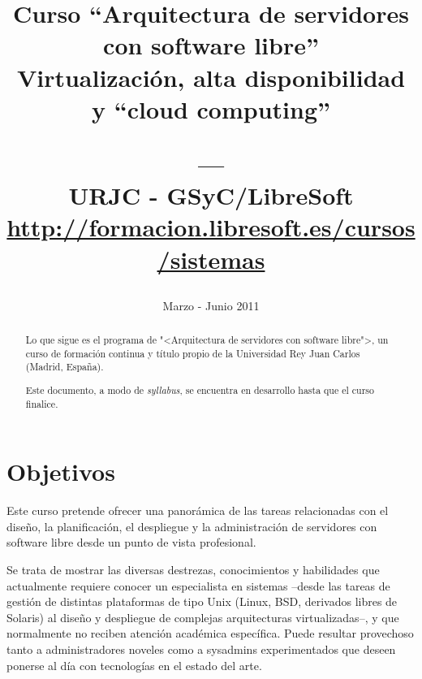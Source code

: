 \documentclass[a4paper]{article}
\title{\textbf{Curso ``Arquitectura de servidores \\ con software libre''} \\
Virtualización, alta disponibilidad \\ y ``cloud computing'' \\
\date{Marzo - Junio 2011}
\vspace{0.5cm}
--- \\
\normalsize{URJC - GSyC/LibreSoft} \\
\small{\url{http://formacion.libresoft.es/cursos/sistemas}}}
\begin{document}
  \maketitle

  \begin{abstract}
    Lo que sigue es el programa de "<Arquitectura de servidores con software libre">, un curso de formación continua y título propio de la Universidad Rey Juan Carlos (Madrid, España). 

    \medskip

    Este documento, a modo de \textit{syllabus}, se encuentra en desarrollo hasta que el curso finalice.
  \end{abstract}
  \newpage

  \tableofcontents

  \newpage

  \section{Objetivos}
  Este curso pretende ofrecer una panorámica de las tareas relacionadas con el diseño, la planificación, el despliegue y la administración de servidores con software libre desde un punto de vista profesional.

Se trata de mostrar las diversas destrezas, conocimientos y habilidades que actualmente requiere conocer un especialista en sistemas –desde las tareas de gestión de distintas plataformas de tipo Unix (Linux, BSD, derivados libres de Solaris) al diseño y despliegue de complejas arquitecturas virtualizadas–, y que normalmente no reciben atención académica específica. Puede resultar provechoso tanto a administradores noveles como a sysadmins experimentados que deseen ponerse al día con tecnologías en el estado del arte.
\end{document}

